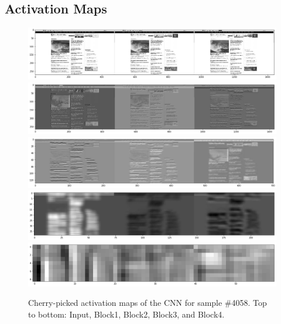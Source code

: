 \subsection{Activation Maps}

\begin{figure}[h]
    \centering
    \includegraphics[clip,width=\columnwidth]{resources/analysis/feat-map-4058-0.png}\\
    \includegraphics[clip,width=\columnwidth]{resources/analysis/feat-map-4058-1.png}\\
    \includegraphics[clip,width=\columnwidth]{resources/analysis/feat-map-4058-2.png}\\
    \includegraphics[clip,width=\columnwidth]{resources/analysis/feat-map-4058-3.png}\\
    \includegraphics[clip,width=\columnwidth]{resources/analysis/feat-map-4058-4.png}\\
    \caption[Activation maps of the CNN for sample \#4058]{Cherry-picked activation maps of the CNN for sample \#4058. Top to bottom: Input, Block1, Block2, Block3, and Block4.}
    \label{fig:activationmaps2}
\end{figure}

